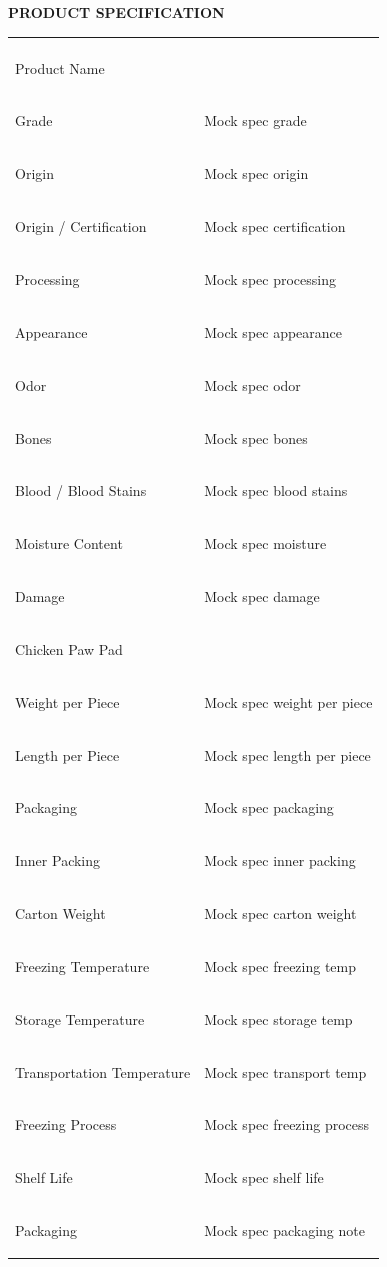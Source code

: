 \documentclass[a4paper,11pt]{article}
\begin{document}
\begin{center}{\large\textbf{\color{marooncolor}PRODUCT SPECIFICATION}}\end{center}
\vspace{0.1cm}
\begin{center}
\begin{tabularx}{\textwidth}{>{\columncolor{lightgray}\bfseries\raggedright\arraybackslash}p{5cm} >{\raggedright\arraybackslash}X}
\multicolumn{1}{>{\columncolor{lightgray}\bfseries\raggedright\arraybackslash}p{5cm}}{CATEGORY} & \multicolumn{1}{>{\bfseries\raggedright\arraybackslash}X}{SPECIFICATION} \\ Product Name &  \\ Grade & Mock spec grade \\ Origin & Mock spec origin \\ Origin / Certification & Mock spec certification \\ Processing & Mock spec processing \\ Appearance & Mock spec appearance \\ Odor & Mock spec odor \\ Bones & Mock spec bones \\ Blood / Blood Stains & Mock spec blood stains \\ Moisture Content & Mock spec moisture \\ Damage & Mock spec damage \\ Chicken Paw Pad &  \\ Weight per Piece & Mock spec weight per piece \\ Length per Piece & Mock spec length per piece \\ Packaging & Mock spec packaging \\ Inner Packing & Mock spec inner packing \\ Carton Weight & Mock spec carton weight \\ Freezing Temperature & Mock spec freezing temp \\ Storage Temperature & Mock spec storage temp \\ Transportation Temperature & Mock spec transport temp \\ Freezing Process & Mock spec freezing process \\ Shelf Life & Mock spec shelf life \\ Packaging & Mock spec packaging note \\ \end{tabularx}
\end{center}
\end{document}
